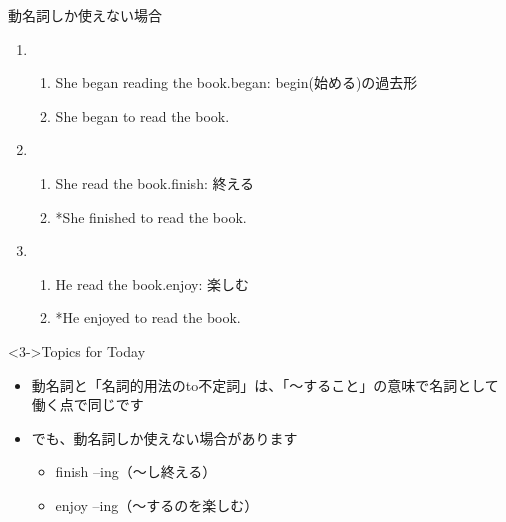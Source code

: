 \documentclass[aspectratio=169,xcolor={dvipsnames,table}]{beamer}
\begin{document}
\begin{frame}[plain]{動名詞しか使えない場合}

 \begin{enumerate}
  \item \begin{enumerate}
	 \item<1-> She began reading the book.\hfill{\scriptsize began: begin(始める)の過去形}
	 \item<2-> She began to read the book.
	\end{enumerate}
  \item \begin{enumerate}
	 \item<4-> She  read the book.\hfill{\scriptsize finish: 終える}
	 \item<5-> *She finished to read the book.
	\end{enumerate}
  \item \begin{enumerate}
	 \item<7-> He  read the book.\hfill{\scriptsize enjoy: 楽しむ}
	 \item<8-> *He enjoyed to read the book.
	\end{enumerate}
 \end{enumerate}
%
\hfill{\scriptsize {}}

\begin{exampleblock}<3->{Topics for Today}
\begin{itemize}\small
 \item<3->  動名詞と「名詞的用法のto不定詞」は、「〜すること」の意味で名詞として働く点で同じです
 \item<6-> でも、動名詞しか使えない場合があります \dbend
       \begin{itemize}
	\item<6-> finish --ing（〜し終える）\hfill{}\hspace{80pt}\mbox{}
	\item<9-> enjoy --ing（〜するのを楽しむ）\hfill{}\hspace{80pt}\mbox{}
       \end{itemize}
 \end{itemize}
     \end{exampleblock}
\end{frame}
\end{document}
